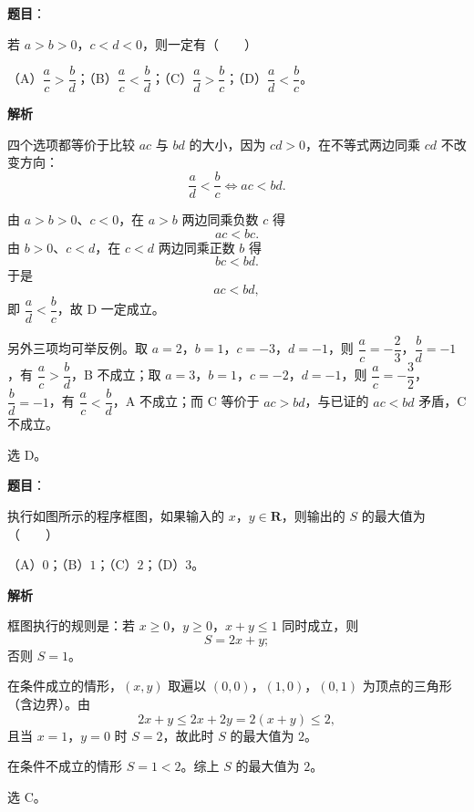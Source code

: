 \begin{answer}

\textbf{题目}：

若 $a>b>0$，$c<d<0$，则一定有\mbox{（　　）}

（A）$\dfrac ac>\dfrac bd$；（B）$\dfrac ac<\dfrac bd$；（C）$\dfrac ad>\dfrac bc$；（D）$\dfrac ad<\dfrac bc$。

\textbf{解析}

四个选项都等价于比较 $ac$ 与 $bd$ 的大小，因为 $cd>0$，在不等式两边同乘 $cd$ 不改变方向：
\nopagebreak[4]
\[\frac ad<\frac bc\iff ac<bd .\]

由 $a>b>0$、$c<0$，在 $a>b$ 两边同乘负数 $c$ 得
\nopagebreak[4]
\[ac<bc .\]
由 $b>0$、$c<d$，在 $c<d$ 两边同乘正数 $b$ 得
\nopagebreak[4]
\[bc<bd .\]
于是
\nopagebreak[4]
\[ac<bd,\]
即 $\dfrac ad<\dfrac bc$，故 D 一定成立。

另外三项均可举反例。取 $a=2$，$b=1$，$c=-3$，$d=-1$，则 $\dfrac ac=-\dfrac23$，$\dfrac bd=-1$，有 $\dfrac ac>\dfrac bd$，B 不成立；取 $a=3$，$b=1$，$c=-2$，$d=-1$，则 $\dfrac ac=-\dfrac32$，$\dfrac bd=-1$，有 $\dfrac ac<\dfrac bd$，A 不成立；而 C 等价于 $ac>bd$，与已证的 $ac<bd$ 矛盾，C 不成立。

选 D。


\end{answer}
\begin{answer}

\textbf{题目}：

执行如图所示的程序框图，如果输入的 $x$，$y\in\mathbf R$，则输出的 $S$ 的最大值为\mbox{（　　）}

（A）$0$；（B）$1$；（C）$2$；（D）$3$。
\nopagebreak[4]
\begin{center}\end{center}
\nopagebreak[4]
\textbf{解析}

框图执行的规则是：若 $x\geqslant 0$，$y\geqslant 0$，$x+y\leqslant 1$ 同时成立，则
\nopagebreak[4]
\[S=2x+y;\]
否则 $S=1$。

在条件成立的情形，$(x,y)$ 取遍以 $(0,0)$，$(1,0)$，$(0,1)$ 为顶点的三角形（含边界）。由
\nopagebreak[4]
\[2x+y\leqslant 2x+2y=2(x+y)\leqslant 2,\]
且当 $x=1$，$y=0$ 时 $S=2$，故此时 $S$ 的最大值为 $2$。

在条件不成立的情形 $S=1<2$。综上 $S$ 的最大值为 $2$。

选 C。


\end{answer}
